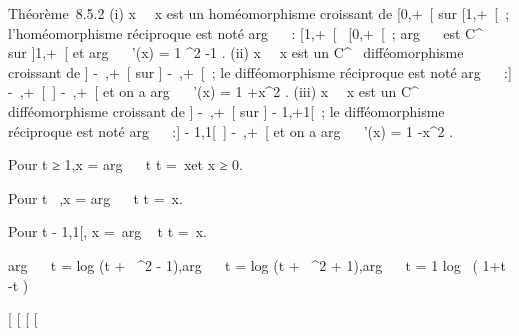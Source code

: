 \documentclass[]{article}
\begin{document}
Théorème~8.5.2 (i)
x\mapsto~\mathrmch~
x est un homéomorphisme croissant de {[}0,+\infty~{[} sur {[}1,+\infty~{[}~;
l'homéomorphisme réciproque est noté arg~
\mathrmch~ : {[}1,+\infty~{[}\rightarrow~
{[}0,+\infty~{[}~; arg~
\mathrmch~ est
C^\infty~ sur {]}1,+\infty~{[} et arg~
\mathrmch~ '(x) = 1
\over \sqrtx^2  -1 . (ii)
x\mapsto~\mathrmsh~
x est un C^\infty~ difféomorphisme croissant de {]} -\infty~,+\infty~{[} sur
{]} -\infty~,+\infty~{[}~; le difféomorphisme réciproque est noté
arg~
\mathrmsh~ :{]} -\infty~,+\infty~{[}\rightarrow~{]}
-\infty~,+\infty~{[} et on a arg~
\mathrmsh~ '(x) = 1
\over {}+x^2 . (iii)
x\mapsto~\mathrmth~
x est un C^\infty~ difféomorphisme croissant de {]} -\infty~,+\infty~{[} sur
{]} - 1,+1{[}~; le difféomorphisme réciproque est noté
arg~
\mathrmth~ :{]} - 1,1{[}\rightarrow~{]}
-\infty~,+\infty~{[} et on a arg~
\mathrmth~ '(x) = 1
-x^2 .

Pour t ≥ 1,\quad x = arg~
\mathrmch~ t
\Leftrightarrow t =\
\mathrmch x\text et x ≥ 0.

Pour t \in {}~,\quad x = arg~
\mathrmsh~ t
\Leftrightarrow t =\
\mathrmsh x.

Pour t \in{]} - 1,1{[}, \quad x =\
arg \mathrmth~ t
\Leftrightarrow t =\
\mathrmth x.

arg~
\mathrmch~ t
= log (t + \sqrtt~^2
 - 1),\quad arg~
\mathrmsh~ t
= log (t + \sqrtt~^2
 + 1),\quad arg~
\mathrmth~ t = 1
\over 2  log~ ( 1+t
\over 1-t )

{[}
{[}
{[}
{[}
\end{document}
